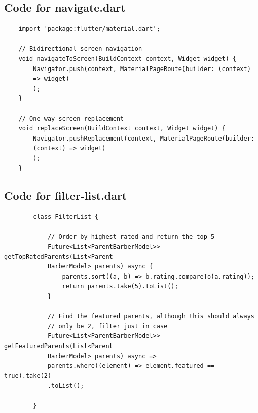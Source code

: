 \documentclass[12pt]{article}
\begin{document}
	\subsection{Code for navigate.dart}
	\label{code:navigate}
	\begin{verbatim}
	import 'package:flutter/material.dart';
	
	// Bidirectional screen navigation
	void navigateToScreen(BuildContext context, Widget widget) {
		Navigator.push(context, MaterialPageRoute(builder: (context) 
		=> widget)
		);
	}
	
	// One way screen replacement
	void replaceScreen(BuildContext context, Widget widget) {
		Navigator.pushReplacement(context, MaterialPageRoute(builder: 
		(context) => widget)
		);
	}	
	\end{verbatim}

	\subsection{Code for filter-list.dart}
	\label{code:filter-list}
	\begin{verbatim}
		class FilterList {
			
			// Order by highest rated and return the top 5
			Future<List<ParentBarberModel>> getTopRatedParents(List<Parent
			BarberModel> parents) async {
				parents.sort((a, b) => b.rating.compareTo(a.rating));
				return parents.take(5).toList();
			}
			
			// Find the featured parents, although this should always 
			// only be 2, filter just in case
			Future<List<ParentBarberModel>> getFeaturedParents(List<Parent
			BarberModel> parents) async =>
			parents.where((element) => element.featured == true).take(2)
			.toList();
			
		}
	\end{verbatim}
\end{document}

